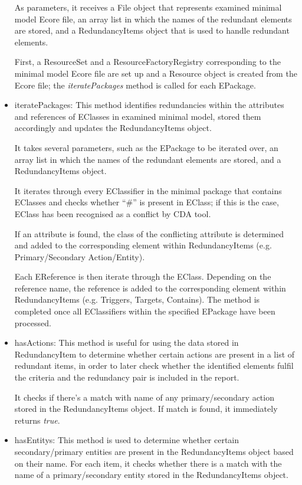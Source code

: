 \begin{itemize}
	As parameters, it receives a File object that represents examined minimal model Ecore file, an array list in which the names of the redundant elements are stored, and a RedundancyItems object that is used to handle redundant elements. 
	
	First, a ResourceSet and a ResourceFactoryRegistry corresponding to the minimal model Ecore file are set up and a Resource object is created from the Ecore file; the \textit{iteratePackages} method is called for each EPackage.
	
	\item iteratePackages: This method identifies redundancies within the attributes and references of EClasses in examined minimal model, stored them accordingly and updates the RedundancyItems object.
	
	It takes several parameters, such as the EPackage to be iterated over, an array list in which the names of the redundant elements are stored, and a RedundancyItems object. 
	
	It iterates through every EClassifier in the minimal package that contains EClasses and checks whether \enquote{\#} is present in EClass; if this is the case, EClass has been recognised as a conflict by CDA tool.
	
	If an attribute is found, the class of the conflicting attribute is determined and added to the corresponding element within RedundancyItems (e.g. Primary/Secondary Action/Entity). 
	
	Each EReference is then iterate through the EClass. Depending on the reference name, the reference is added to the corresponding element within RedundancyItems (e.g. Triggers, Targets, Contains). The method is completed once all EClassifiers within the specified EPackage have been processed.
	
	\item hasActions: This method is useful for using the data stored in RedundancyItem to determine whether certain actions are present in a list of redundant items, in order to later check whether the identified elements fulfil the criteria and the redundancy pair is included in the report.
	
	It checks if there's a match with name of any primary/secondary action stored in the RedundancyItems object. If match is found, it immediately returns \textit{true}.
	
	\item hasEntitys: This method is used to determine whether certain secondary/primary entities  are present in the RedundancyItems object based on their name. For each item, it checks whether there is a match with the name of a primary/secondary entity stored in the RedundancyItems object. 
	

\end{itemize}
